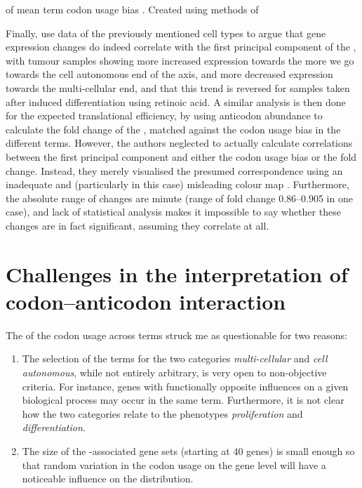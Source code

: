     {\pca of mean \go term codon usage bias}
    {. Created using methods of \citet{Gingold:2014}}


Finally, \citet{Gingold:2014} use \rnaseq data of the previously mentioned cell
types to argue that gene expression changes do indeed correlate with the first
principal component of the \pca, with tumour samples showing more increased
expression towards the more we go towards the cell autonomous end of the axis,
and more decreased expression towards the multi-cellular end, and that this
trend is reversed for samples taken after induced differentiation using retinoic
acid. A similar analysis is then done for the expected translational efficiency,
by using \trna anticodon abundance to calculate the fold change of the \tai,
matched against the codon usage bias in the different \go terms. However, the
authors neglected to actually calculate correlations between the first principal
component and either the codon usage bias or the \tai fold change. Instead, they
merely visualised the presumed correspondence using an inadequate and
(particularly in this case) misleading colour map \citep{Borland:2007}.
Furthermore, the absolute range of changes are minute (range of \tai fold change
\numrange{0.86}{0.905} in one case), and lack of statistical analysis makes it
impossible to say whether these changes are in fact significant, assuming they
correlate at all.

\section{Challenges in the interpretation of codon–anticodon interaction}

The \pca of the codon usage across \go terms struck me as questionable for two
reasons:

\begin{enumerate}
    \item The selection of the \go terms for the two categories
        \emph{multi-cellular} and \emph{cell autonomous}, while not entirely
        arbitrary, is very open to non-objective criteria. For instance, genes
        with functionally opposite influences on a given biological process may
        occur in the same \go term. Furthermore, it is not clear how the two
        categories relate to the phenotypes \emph{proliferation} and
        \emph{differentiation}.
    \item The size of the \go-associated gene sets (starting at \num{40} genes)
        is small enough so that random variation in the codon usage on the gene
        level will have a noticeable influence on the distribution.
\end{enumerate}

